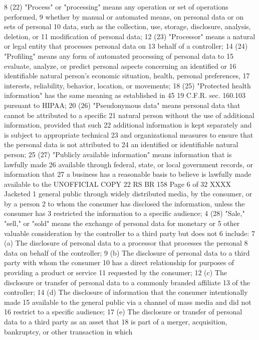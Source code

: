 8 (22) "Process" or "processing" means any operation or set of operations performed,
9 whether by manual or automated means, on personal data or on sets of personal
10 data, such as the collection, use, storage, disclosure, analysis, deletion, or
11 modification of personal data;
12 (23) "Processor" means a natural or legal entity that processes personal data on
13 behalf of a controller;
14 (24) "Profiling" means any form of automated processing of personal data to
15 evaluate, analyze, or predict personal aspects concerning an identified or
16 identifiable natural person's economic situation, health, personal preferences,
17 interests, reliability, behavior, location, or movements;
18 (25) "Protected health information" has the same meaning as established in 45
19 C.F.R. sec. 160.103 pursuant to HIPAA;
20 (26) "Pseudonymous data" means personal data that cannot be attributed to a specific
21 natural person without the use of additional information, provided that such
22 additional information is kept separately and is subject to appropriate technical
23 and organizational measures to ensure that the personal data is not attributed to
24 an identified or identifiable natural person;
25 (27) "Publicly available information" means information that is lawfully made
26 available through federal, state, or local government records, or information that
27 a business has a reasonable basis to believe is lawfully made available to the 
UNOFFICIAL COPY 22 RS BR 158
Page 6 of 32
XXXX Jacketed
1 general public through widely distributed media, by the consumer, or by a person
2 to whom the consumer has disclosed the information, unless the consumer has
3 restricted the information to a specific audience;
4 (28) "Sale," "sell," or "sold" means the exchange of personal data for monetary or
5 other valuable consideration by the controller to a third party but does not
6 include:
7 (a) The disclosure of personal data to a processor that processes the personal
8 data on behalf of the controller;
9 (b) The disclosure of personal data to a third party with whom the consumer
10 has a direct relationship for purposes of providing a product or service
11 requested by the consumer;
12 (c) The disclosure or transfer of personal data to a commonly branded affiliate
13 of the controller;
14 (d) The disclosure of information that the consumer intentionally made
15 available to the general public via a channel of mass media and did not
16 restrict to a specific audience;
17 (e) The disclosure or transfer of personal data to a third party as an asset that
18 is part of a merger, acquisition, bankruptcy, or other transaction in which

